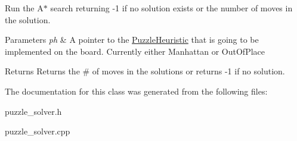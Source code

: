 \-Run the \-A$\ast$ search returning -\/1 if no solution exists or the number of moves in the solution. 
\begin{DoxyParams}{\-Parameters}
{\em ph} & \-A pointer to the \hyperlink{classPuzzleHeuristic}{\-Puzzle\-Heuristic} that is going to be implemented on the board. \-Currently either \-Manhattan or \-Out\-Of\-Place \\
\hline
\end{DoxyParams}
\begin{DoxyReturn}{\-Returns}
\-Returns the \# of moves in the solutions or returns -\/1 if no solution. 
\end{DoxyReturn}


\-The documentation for this class was generated from the following files\-:\begin{DoxyCompactItemize}
\item 
puzzle\-\_\-solver.\-h\item 
puzzle\-\_\-solver.\-cpp\end{DoxyCompactItemize}

